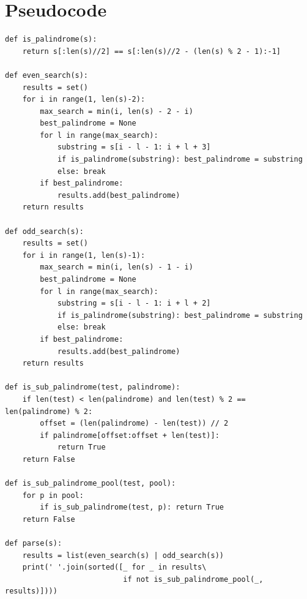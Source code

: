 \documentclass{article}
\begin{document}
\newpage

\section{Pseudocode}
\vspace{-12pt}
\begin{verbatim}
def is_palindrome(s):
    return s[:len(s)//2] == s[:len(s)//2 - (len(s) % 2 - 1):-1]

def even_search(s):
    results = set()
    for i in range(1, len(s)-2):
        max_search = min(i, len(s) - 2 - i)
        best_palindrome = None
        for l in range(max_search):
            substring = s[i - l - 1: i + l + 3]
            if is_palindrome(substring): best_palindrome = substring
            else: break
        if best_palindrome:
            results.add(best_palindrome)
    return results

def odd_search(s):
    results = set()
    for i in range(1, len(s)-1):
        max_search = min(i, len(s) - 1 - i)
        best_palindrome = None
        for l in range(max_search):
            substring = s[i - l - 1: i + l + 2]
            if is_palindrome(substring): best_palindrome = substring
            else: break
        if best_palindrome:
            results.add(best_palindrome)
    return results

def is_sub_palindrome(test, palindrome):
    if len(test) < len(palindrome) and len(test) % 2 == len(palindrome) % 2:
        offset = (len(palindrome) - len(test)) // 2
        if palindrome[offset:offset + len(test)]:
            return True
    return False

def is_sub_palindrome_pool(test, pool):
    for p in pool:
        if is_sub_palindrome(test, p): return True
    return False

def parse(s):
    results = list(even_search(s) | odd_search(s))
    print(' '.join(sorted([_ for _ in results\
                           if not is_sub_palindrome_pool(_, results)])))
\end{verbatim}
\end{document}
